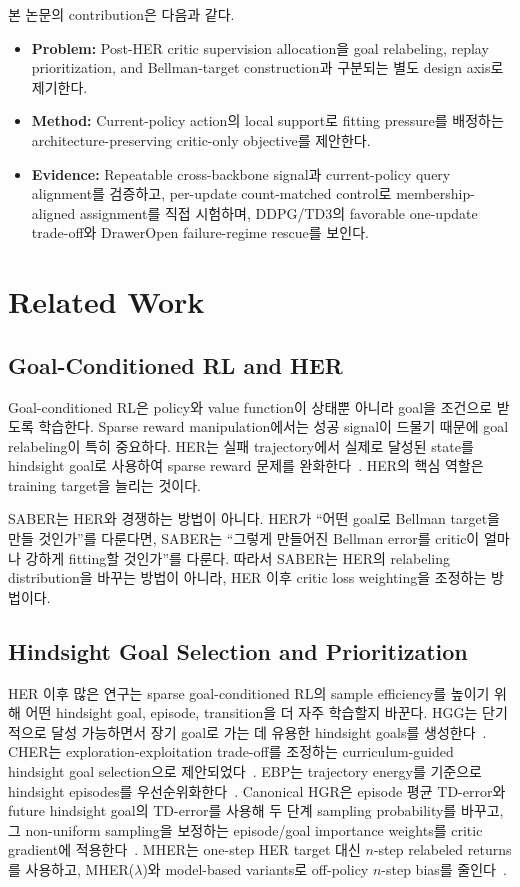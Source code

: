\documentclass[letterpaper]{article}
\begin{document}
본 논문의 contribution은 다음과 같다.
\begin{itemize}
    \item \textbf{Problem:} Post-HER critic supervision allocation을 goal relabeling, replay prioritization, and Bellman-target construction과 구분되는 별도 design axis로 제기한다.
    \item \textbf{Method:} Current-policy action의 local support로 fitting pressure를 배정하는 architecture-preserving critic-only objective를 제안한다.
    \item \textbf{Evidence:} Repeatable cross-backbone signal과 current-policy query alignment를 검증하고, per-update count-matched control로 membership-aligned assignment를 직접 시험하며, DDPG/TD3의 favorable one-update trade-off와 DrawerOpen failure-regime rescue를 보인다.
\end{itemize}

\section{Related Work}

\subsection{Goal-Conditioned RL and HER}

Goal-conditioned RL은 policy와 value function이 상태뿐 아니라 goal을 조건으로 받도록 학습한다. Sparse reward manipulation에서는 성공 signal이 드물기 때문에 goal relabeling이 특히 중요하다. HER는 실패 trajectory에서 실제로 달성된 state를 hindsight goal로 사용하여 sparse reward 문제를 완화한다~\citep{andrychowicz2017her}. HER의 핵심 역할은 training target을 늘리는 것이다.

SABER는 HER와 경쟁하는 방법이 아니다. HER가 ``어떤 goal로 Bellman target을 만들 것인가''를 다룬다면, SABER는 ``그렇게 만들어진 Bellman error를 critic이 얼마나 강하게 fitting할 것인가''를 다룬다. 따라서 SABER는 HER의 relabeling distribution을 바꾸는 방법이 아니라, HER 이후 critic loss weighting을 조정하는 방법이다.

\subsection{Hindsight Goal Selection and Prioritization}

HER 이후 많은 연구는 sparse goal-conditioned RL의 sample efficiency를 높이기 위해 어떤 hindsight goal, episode, transition을 더 자주 학습할지 바꾼다. HGG는 단기적으로 달성 가능하면서 장기 goal로 가는 데 유용한 hindsight goals를 생성한다~\citep{ren2019hgg}. CHER는 exploration-exploitation trade-off를 조정하는 curriculum-guided hindsight goal selection으로 제안되었다~\citep{fang2019cher}. EBP는 trajectory energy를 기준으로 hindsight episodes를 우선순위화한다~\citep{zhao2018ebp}. Canonical HGR은 episode 평균 TD-error와 future hindsight goal의 TD-error를 사용해 두 단계 sampling probability를 바꾸고, 그 non-uniform sampling을 보정하는 episode/goal importance weights를 critic gradient에 적용한다~\citep{luu2021hgr}. MHER는 one-step HER target 대신 \(n\)-step relabeled returns를 사용하고, MHER(\(\lambda\))와 model-based variants로 off-policy \(n\)-step bias를 줄인다~\citep{yang2021mher}.
\end{document}
